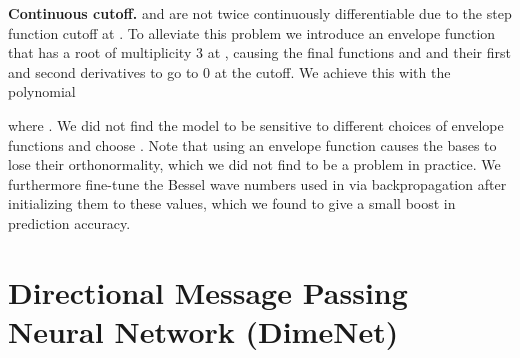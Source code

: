 \documentclass{article} \usepackage{iclr2020_conference,times}
\begin{document}
\textbf{Continuous cutoff.}  and  are not twice continuously differentiable due to the step function cutoff at . To alleviate this problem we introduce an envelope function  that has a root of multiplicity 3 at , causing the final functions  and  and their first and second derivatives to go to 0 at the cutoff. We achieve this with the polynomial

where . We did not find the model to be sensitive to different choices of envelope functions and choose . Note that using an envelope function causes the bases to lose their orthonormality, which we did not find to be a problem in practice. We furthermore fine-tune the Bessel wave numbers  used in  via backpropagation after initializing them to these values, which we found to give a small boost in prediction accuracy.

\section{Directional Message Passing Neural Network (DimeNet)}
\end{document}
